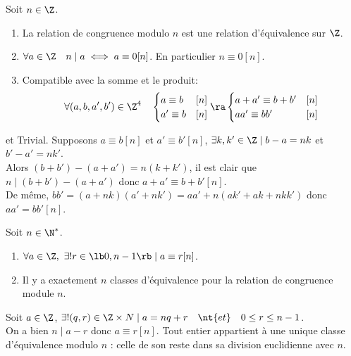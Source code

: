 \documentclass[11pt]{article}
\begin{document}
\begin{prop}{}{}
    Soit $n\in\Z$.
    \begin{enumerate}[topsep=0pt,itemsep=-0.9 ex]
        \item La relation de congruence modulo $n$ est une relation d'équivalence sur $\Z$.
        \item $\forall a \in \Z \quad n \mid a \iff a \equiv 0[n]$. En particulier $n\equiv 0[n]$.
        \item Compatible avec la somme et le produit:
        \begin{equation*}
            \forall (a,b,a',b')\in\Z^4\quad\begin{cases}
                a\equiv b &[n]\\
                a'\equiv b &[n]
            \end{cases}\ra\begin{cases}
                a+a'\equiv b+b' &[n]\\
                aa'\equiv bb' &[n]
            \end{cases}
        \end{equation*}
    \end{enumerate}
    \tcblower
     et  Trivial.\n
     Supposons $a\equiv b[n]$ et $a'\equiv b'[n]$, $\exists k,k'\in\Z\mid b-a=nk$ et $b'-a'=nk'$.\\
    Alors $(b+b')-(a+a')=n(k+k')$, il est clair que $n\mid (b+b')-(a+a')$ donc $a+a'\equiv b+b'[n]$.\\
    De même, $bb'=(a+nk)(a'+nk')=aa'+n(ak'+ak+nkk')$ donc $aa'=bb'[n]$.
\end{prop}

\begin{prop}{}{}
    Soit $n\in\N^*$.
    \begin{enumerate}[topsep=0pt,itemsep=-0.9 ex]
        \item $\forall a \in \Z, ~ \exists!r\in\lb0,n-1\rb\mid a\equiv r[n]$.
        \item Il y a exactement $n$ classes d'équivalence pour la relation de congruence module $n$.
    \end{enumerate}
    \tcblower
     Soit $a\in\Z$, $\exists!(q,r)\in\Z\times N \mid a=nq+r \quad \nt{et} \quad 0\leq r \leq n-1$.\\
    On a bien $n\mid a-r$ donc $a\equiv r[n]$.\n
     Tout entier appartient à une unique classe d'équivalence modulo $n$ : celle de son reste dans sa division euclidienne avec $n$.
\end{prop}
\end{document}
